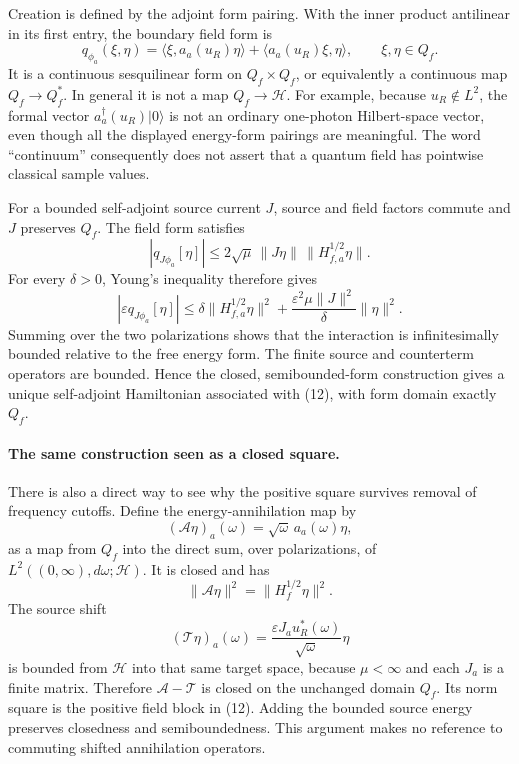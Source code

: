 \documentclass[10pt,twocolumn,letterpaper]{article}
\begin{document}
Creation is defined by the adjoint form pairing.  With the inner product
antilinear in its first entry, the boundary field form is
\[
q_{\phi_a}(\xi,\eta)
=\langle\xi,a_a(u_R)\eta\rangle
+\langle a_a(u_R)\xi,\eta\rangle,
\qquad \xi,\eta\in Q_f.
\]
It is a continuous sesquilinear form on $Q_f\times Q_f$, or
equivalently a continuous map $Q_f\to Q_f^*$.  In general it is not a
map $Q_f\to\mathcal H$.  For example, because $u_R\notin L^2$, the
formal vector $a_a^\dagger(u_R)|0\rangle$ is not an ordinary one-photon
Hilbert-space vector, even though all the displayed energy-form
pairings are meaningful.  The word ``continuum'' consequently does not
assert that a quantum field has pointwise classical sample values.

For a bounded self-adjoint source current $J$, source and field factors
commute and $J$ preserves $Q_f$.  The field form satisfies
\[
|q_{J\phi_a}[\eta]|
\le2\sqrt\mu\,\|J\eta\|\,
\|H_{f,a}^{1/2}\eta\|.
\]
For every $\delta>0$, Young's inequality therefore gives
\[
|\varepsilon q_{J\phi_a}[\eta]|
\le\delta\|H_{f,a}^{1/2}\eta\|^2
+\frac{\varepsilon^2\mu\|J\|^2}{\delta}\|\eta\|^2.
\]
Summing over the two polarizations shows that the interaction is
infinitesimally bounded relative to the free energy form.  The finite
source and counterterm operators are bounded.  Hence the closed,
semibounded-form construction gives a unique self-adjoint Hamiltonian
associated with (12), with form domain exactly $Q_f$.

\paragraph{The same construction seen as a closed square.}
There is also a direct way to see why the positive square survives
removal of frequency cutoffs.  Define the energy-annihilation map by
\[
(\mathcal A\eta)_a(\omega)
=\sqrt\omega\,a_a(\omega)\eta,
\]
as a map from $Q_f$ into the direct sum, over polarizations, of
$L^2((0,\infty),d\omega;\mathcal H)$.  It is closed and has
\[
\|\mathcal A\eta\|^2=\|H_f^{1/2}\eta\|^2.
\]
The source shift
\[
(\mathcal T\eta)_a(\omega)
=\frac{\varepsilon J_a u_R^*(\omega)}{\sqrt\omega}\eta
\]
is bounded from $\mathcal H$ into that same target space, because
$\mu<\infty$ and each $J_a$ is a finite matrix.  Therefore
$\mathcal A-\mathcal T$ is closed on the unchanged domain $Q_f$.
Its norm square is the positive field block in (12).  Adding the
bounded source energy preserves closedness and semiboundedness.
This argument makes no reference to commuting shifted annihilation
operators.
\end{document}
